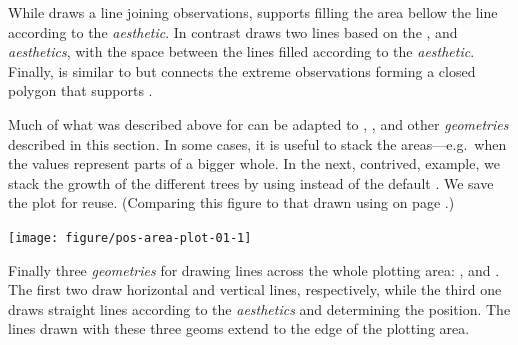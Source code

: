 \documentclass[krantz2]{krantz}\usepackage{knitr}%
\begin{document}
While  draws a line joining observations,  supports filling the area bellow the line according to the  \emph{aesthetic}. In contrast  draws two lines based on the ,  and  \emph{aesthetics}, with the space between the lines filled according to the  \emph{aesthetic}. Finally,  is similar to  but connects the extreme observations forming a closed polygon that supports .

Much of what was described above for  can be adapted to , ,   and other \emph{geometries} described in this section. In some cases, it is useful to stack the areas---e.g.\ when the values represent parts of a bigger whole. In the next, contrived, example, we stack the growth of the different trees by using  instead of the default . We save the plot for reuse. (Comparing this figure to that drawn using  on page \pageref{plot:fig:lines}.)

\begin{knitrout}\footnotesize
{}\color{fgcolor}\begin{kframe}
\begin{alltt}
\hlstd{(} 
       \hlstd{(}      \hlopt{+}
  \hlstd{(} \hlstd{=} \hlstd{)}
\end{alltt}
\end{kframe}

{\centering \texttt{[image: figure/pos-area-plot-01-1]} 

}



\end{knitrout}

Finally\label{sec:plot:vhline} three \emph{geometries} for drawing lines across the whole plotting area: ,  and . The first two draw horizontal and vertical lines, respectively, while the third one draws straight lines according to the \emph{aesthetics}  and  determining the position. The lines drawn with these three geoms extend to the edge of the plotting area.
\end{document}

